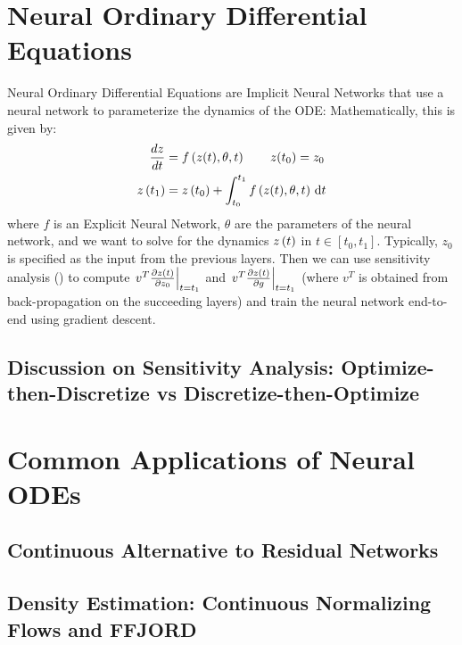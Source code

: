 \section{Neural Ordinary Differential Equations}
\label{sec:neural_odes}

Neural Ordinary Differential Equations are Implicit Neural Networks that use a neural network to parameterize the dynamics of the ODE: Mathematically, this is given by:
%
\begin{align}
  \frac{dz}{dt} & = f\left(z(t), \theta, t\right) \qquad z(t_0) = z_0                     \\
  z\left(t_1\right) & = z\left(t_0\right) + \int_{t_0}^{t_1} f\left(z(t), \theta, t\right) \, \mathrm{d}t
\end{align}
%
where $f$ is an Explicit Neural Network, $\theta$ are the parameters of the neural network, and we want to solve for the dynamics $z\left(t\right)$ in $t \in [t_0, t_1]$. Typically, $z_0$ is specified as the input from the previous layers. Then we can use sensitivity analysis () to compute $\left. v^T \frac{\partial z\left(t\right)}{\partial z_0} \right|_{t = t_1}$ and $\left. v^T \frac{\partial z\left(t\right)}{\partial g} \right|_{t = t_1}$ (where $v^T$ is obtained from back-propagation on the succeeding layers) and train the neural network end-to-end using gradient descent.

\subsection{Discussion on Sensitivity Analysis: Optimize-then-Discretize vs Discretize-then-Optimize}
\label{subsec:discussion_on_sensitivity_analysis_optimize_then_discretize_vs_discretize_then_optimize}

\section{Common Applications of Neural ODEs}
\label{sec:neural_odes_applications}

\subsection{Continuous Alternative to Residual Networks}
\label{subsec:continuous_alternative_to_residual_networks}

\subsection{Density Estimation: Continuous Normalizing Flows and FFJORD}
\label{subsec:density_estimation_neural_odes}

